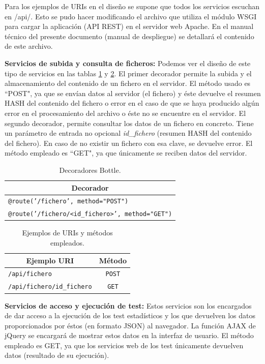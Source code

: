 Para los ejemplos de URIs en el diseño se supone que todos los servicios escuchan en /api/. Esto se pudo hacer modificando el archivo que utiliza el módulo WSGI para cargar la aplicación (API REST) en el servidor web Apache. En el manual técnico del presente documento (manual de despliegue) se detallará el contenido de este archivo.

\textbf{Servicios de subida y consulta de ficheros:} Podemos ver el diseño de este tipo de servicios en las tablas \ref{cuadro1} y \ref{cuadro2}. El primer decorador permite la subida y el almacenamiento del contenido de un fichero en el servidor. El método usado es ``POST", ya que se envían datos al servidor (el fichero) y éste devuelve el resumen HASH del contenido del fichero o error en el caso de que se haya producido algún error en el procesamiento del archivo o éste no se encuentre en el servidor. El segundo decorador, permite consultar los datos de un fichero en concreto. Tiene un parámetro de entrada no opcional \textit{id\_fichero} (resumen HASH del contenido del fichero). En caso de no existir un fichero con esa clave, se devuelve error. El método empleado es ``GET", ya que únicamente se reciben datos del servidor.

\begin{table}[H]
	\centering
	\begin{tabular}{|l|}
		\hline
		\multicolumn{1}{|c|}{\textbf{Decorador}} \\ \hline
		\texttt{@route('/fichero', method="POST")} \\ \hline
		\texttt{@route('/fichero/<id\_fichero>', method="GET")} \\ \hline
	\end{tabular}
	\caption{Decoradores Bottle.}
	\label{cuadro1}
\end{table}

\begin{table}[H]
	\centering
	\begin{tabular}{|l|c|}
		\hline
		\multicolumn{1}{|c|}{\textbf{Ejemplo URI}} & {\textbf{Método}} \\ \hline
		\texttt{/api/fichero} & \texttt{POST} \\ \hline
		\texttt{/api/fichero/id\_fichero} & \texttt{GET} \\ \hline
	\end{tabular}
	\caption{Ejemplos de URIs y métodos empleados.}
	\label{cuadro2}
\end{table}

\textbf{Servicios de acceso y ejecución de test:} Estos servicios son los encargados de dar acceso a la ejecución de los test estadísticos y los que devuelven los datos proporcionados por éstos (en formato JSON) al navegador. La función AJAX de jQuery se encargará de mostrar estos datos en la interfaz de usuario. El método empleado es GET, ya que los servicios web de los test únicamente devuelven datos (resultado de su ejecución).

